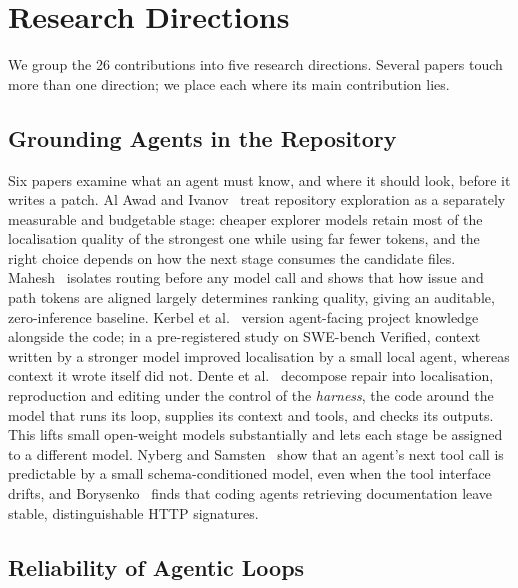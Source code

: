 \section{Research Directions}
\label{sec:directions}

We group the 26 contributions into five research directions. Several papers touch more than one direction; we place each where its main contribution lies.

\subsection{Grounding Agents in the Repository}

Six papers examine what an agent must know, and where it should look, before it writes a patch. Al Awad and Ivanov~\cite{agdev26:alawad} treat repository exploration as a separately measurable and budgetable stage: cheaper explorer models retain most of the localisation quality of the strongest one while using far fewer tokens, and the right choice depends on how the next stage consumes the candidate files. Mahesh~\cite{agdev26:mahesh} isolates routing before any model call and shows that how issue and path tokens are aligned largely determines ranking quality, giving an auditable, zero-inference baseline. Kerbel et al.~\cite{agdev26:kerbel} version agent-facing project knowledge alongside the code; in a pre-registered study on SWE-bench Verified, context written by a stronger model improved localisation by a small local agent, whereas context it wrote itself did not. Dente et al.~\cite{agdev26:dente} decompose repair into localisation, reproduction and editing under the control of the \emph{harness}, the code around the model that runs its loop, supplies its context and tools, and checks its outputs. This lifts small open-weight models substantially and lets each stage be assigned to a different model. Nyberg and Samsten~\cite{agdev26:nyberg} show that an agent's next tool call is predictable by a small schema-conditioned model, even when the tool interface drifts, and Borysenko~\cite{agdev26:borysenko} finds that coding agents retrieving documentation leave stable, distinguishable HTTP signatures.

\subsection{Reliability of Agentic Loops}

